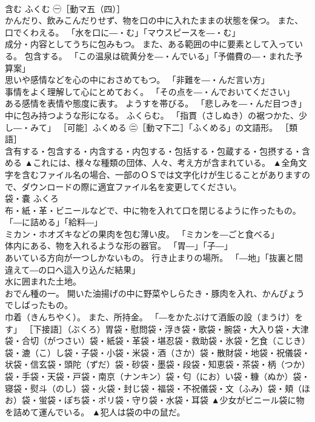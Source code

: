 \documentclass[8pt]{extreport}
\begin{document}
\begin{CJK}{UTF8}{min}
\\	含む	ふくむ	㊀［動マ五（四）］ 
\\	かんだり、飲みこんだりせず、物を口の中に入れたままの状態を保つ。 また、口でくわえる。 「水を口に―・む」「マウスピースを―・む」 
\\	成分・内容としてうちに包みもつ。 また、ある範囲の中に要素として入っている。 包含する。 「この温泉は硫黄分を―・んでいる」「予備費の―・まれた予算案」 
\\	思いや感情などを心の中におさめてもつ。 「非難を―・んだ言い方」 
\\	事情をよく理解して心にとめておく。 「その点を―・んでおいてください」 
\\	ある感情を表情や態度に表す。 ようすを帯びる。 「悲しみを―・んだ目つき」 
\\	中に包み持つような形になる。 ふくらむ。 「指貫（さしぬき）の裾つかた、少し―・みて」 ［可能］ふくめる ㊁［動マ下二］「ふくめる」の文語形。 ［類語］
\\	含有する・包含する・内含する・内包する・包括する・包蔵する・包摂する・含める	▲これには、様々な種類の団体、人々、考え方が含まれている。 ▲全角文字を含むファイル名の場合、一部のＯＳでは文字化けが生じることがありますので、ダウンロードの際に適宜ファイル名を変更してください。
\\	袋・嚢	ふくろ	
\\	布・紙・革・ビニールなどで、中に物を入れて口を閉じるように作ったもの。 「―に詰める」「給料―」 
\\	ミカン・ホオズキなどの果肉を包む薄い皮。 「ミカンを―ごと食べる」 
\\	体内にある、物を入れるような形の器官。 「胃―」「子―」 
\\	あいている方向が一つしかないもの。 行き止まりの場所。 「―地」「抜裏と間違えて―の口へ這入り込んだ結果」 
\\	水に囲まれた土地。 
\\	おでん種の一。 開いた油揚げの中に野菜やしらたき・豚肉を入れ、かんぴょうでしばったもの。 
\\	巾着（きんちやく）。 また、所持金。 「―をかたぶけて酒飯の設（まうけ）をす」 ［下接語］（ぶくろ）胃袋・慰問袋・浮き袋・歌袋・腕袋・大入り袋・大津袋・合切（がつさい）袋・紙袋・革袋・堪忍袋・救助袋・氷袋・乞食（こじき）袋・漉（こ）し袋・子袋・小袋・米袋・酒（さか）袋・散財袋・地袋・祝儀袋・状袋・信玄袋・頭陀（ずだ）袋・砂袋・墨袋・段袋・知恵袋・茶袋・柄（つか）袋・手袋・天袋・戸袋・南京（ナンキン）袋・匂（にお）い袋・糠（ぬか）袋・寝袋・熨斗（のし）袋・火袋・封じ袋・福袋・不祝儀袋・文（ふみ）袋・頬（ほお）袋・蛍袋・ぽち袋・ポリ袋・守り袋・水袋・耳袋	▲少女がビニール袋に物を詰めて運んでいる。 ▲犯人は袋の中の鼠だ。

\end{CJK}
\end{document}
